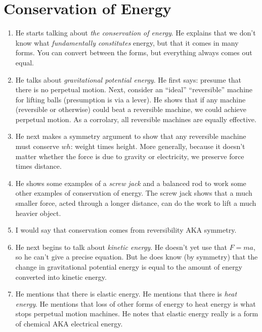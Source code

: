\section{Conservation of Energy}

\begin{enumerate}

  \item He starts talking about \emph{the conservation of energy}. He
  explains that we don't know what \emph{fundamentally constitutes}
  energy, but that it comes in many forms. You can convert between the
  forms, but everything always comes out equal.

  \item He talks about \emph{gravitational potential energy}. He first
  says: presume that there is no perpetual motion. Next, consider an
  ``ideal'' ``reversible'' machine for lifting balls (presumption is via a
  lever). He shows that if any machine (reversible or otherwise) could
  beat a reversible machine, we could achieve perpetual motion. As a
  corrolary, all reversible machines are equally effective.

  \item He next makes a symmetry argument to show that any reversible
  machine must conserve $wh$: weight times height. More generally,
  because it doesn't matter whether the force is due to gravity or
  electricity, we preserve force times distance.

  \item He shows some examples of a \emph{screw jack} and a balanced rod
  to work some other examples of conservation of energy. The screw jack
  shows that a much smaller force, acted through a longer distance, can
  do the work to lift a much heavier object.

  \item I would say that conservation comes from reversibility AKA
  symmetry.

  \item He next begins to talk about \emph{kinetic energy}. He doesn't
  yet use that $F = ma$, so he can't give a precise equation. But he
  does know (by symmetry) that the change in gravitational potential
  energy is equal to the amount of energy converted into kinetic energy.

  \item He mentions that there is elastic energy. He mentions that there
  is \emph{heat energy}. He mentions that loss of other forms of energy
  to heat energy is what stops perpetual motion machines. He notes that
  elastic energy really is a form of chemical AKA electrical energy.


\end{enumerate}
